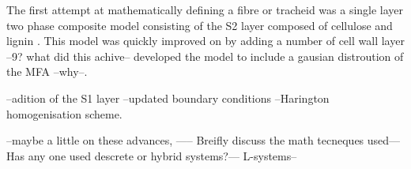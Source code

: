  The first attempt at mathematically defining a fibre or tracheid was a single layer two phase composite model consisting of the S2 layer composed of cellulose and lignin \cite{Barber_1964}. This model was quickly improved on by \cite{mark1967cell} adding a number of cell wall layer --9? what did this achive-- \cite{Cave_1968} developed the model to include a gausian distroution of the MFA --why--. 
 
 --adition of the S1 layer
 --updated boundary conditions
 --Harington homogenisation scheme. 
 
 
 --maybe a little on these advances, ----- Breifly discuss the math
tecneques used---Has any one used descrete or hybrid systems?--- L-systems--